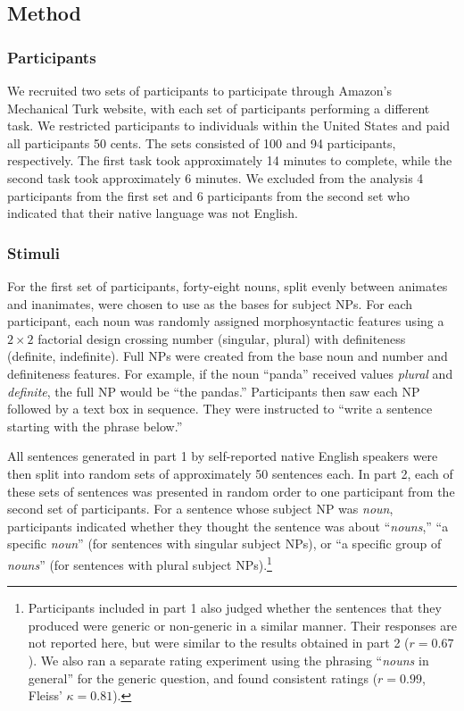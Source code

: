 \documentclass[10pt,letterpaper]{article}
\begin{document}
\subsection{Method}

\subsubsection{Participants}

We recruited two sets of participants to participate through Amazon's Mechanical Turk website, with each set of participants performing a different task. We restricted participants to individuals within the United States and paid all participants 50 cents. The sets consisted of 100 and 94 participants, respectively. The first task took approximately 14 minutes to complete, while the second task took approximately 6 minutes. We excluded from the analysis 4 participants from the first set and 6 participants from the second set who indicated that their native language was not English.

\subsubsection{Stimuli}

For the first set of participants, forty-eight nouns, split evenly between animates and inanimates, were chosen to use as the bases for subject NPs. For each participant, each noun was randomly assigned morphosyntactic features using a \(2 \times 2\) factorial design crossing number (singular, plural) with definiteness (definite, indefinite). Full NPs were created from the base noun and number and definiteness features. For example, if the noun ``panda'' received values \textit{plural} and \textit{definite}, the full NP would be ``the pandas.'' Participants then saw each NP followed by a text box in sequence. They were instructed to ``write a sentence starting with the phrase below.''

All sentences generated in part 1 by self-reported native English speakers were then split into random sets of approximately 50 sentences each. In part 2, each of these sets of sentences was presented in random order to one participant from the second set of participants. For a sentence whose subject NP was \textit{noun}, participants indicated whether they thought the sentence was about ``\textit{nouns},'' ``a specific \textit{noun}'' (for sentences with singular subject NPs), or ``a specific group of \textit{nouns}'' (for sentences with plural subject NPs).\footnote{Participants included in part 1 also judged whether the sentences that they produced were generic or non-generic in a similar manner. Their responses are not reported here, but were similar to the results obtained in part 2 (\(r = 0.67\)). We also ran a separate rating experiment using the phrasing ``\textit{nouns} in general'' for the generic question, and found consistent ratings (\(r = 0.99\), Fleiss' \(\kappa = 0.81\)).}
\end{document}
